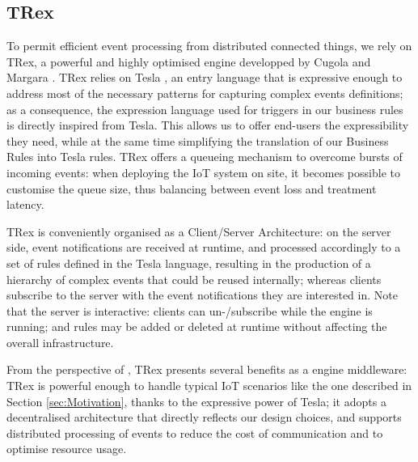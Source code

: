 \subsection{TRex}
\label{sec:CG-TRex}

To permit efficient event processing from distributed connected things, we rely on TRex, a powerful and highly optimised \CEP engine developped by Cugola and Margara \cite{cugola-12}. TRex relies on Tesla \cite{Cugola-Margara:2010}, an entry language that is expressive enough to address most of the necessary patterns for capturing complex events definitions; as a consequence, the expression language used for triggers in our business rules is directly inspired from Tesla. This allows us to offer end-users the expressibility they need, while at the same time simplifying the translation of our Business Rules into Tesla rules. TRex offers a queueing mechanism to overcome bursts of incoming events: when deploying the IoT system on site, it becomes possible to customise the queue size, thus balancing between event loss and treatment latency. 

TRex is conveniently organised as a Client/Server Architecture: on the server side, event notifications are received at runtime, and processed accordingly to a set of rules defined in the Tesla language, resulting in the production of a hierarchy of complex events that could be reused internally; whereas clients subscribe to the server with the event notifications they are interested in. Note that the server is interactive: clients can un-/subscribe while the engine is running; and rules may be added or deleted at runtime without affecting the overall infrastructure. 

From the perspective of \IOTDSL, TRex presents several benefits as a \CEP engine middleware: TRex is powerful enough to handle typical IoT scenarios like the one described in Section \ref{sec:Motivation}, thanks to the expressive power of Tesla; it adopts a decentralised architecture that directly reflects our design choices, and supports distributed processing of events to reduce the cost of communication and to optimise resource usage. 
